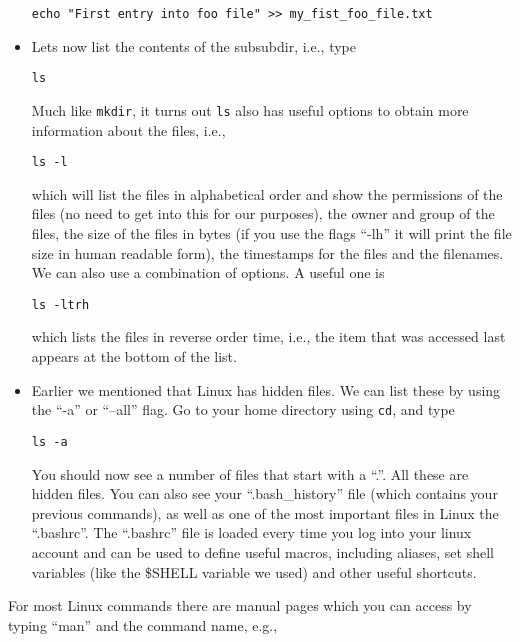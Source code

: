 \documentclass[aps,showpacs,prd,notitlepage,preprintnumbers,amsmath,amssymb,letterpaper]{revtex4}
\begin{document}
\begin{itemize}
\begin{verbatim}
echo "First entry into foo file" >> my_fist_foo_file.txt
\end{verbatim}

\item Lets now list the contents of the subsubdir, i.e., type

\begin{verbatim}
ls 
\end{verbatim}

Much like \verb|mkdir|, it turns out \verb|ls| also has useful options to obtain more information about the files, i.e.,

\begin{verbatim}
ls -l
\end{verbatim}

which will list the files in alphabetical order and show the permissions of the files (no need to get into this for our purposes), the owner and group of the files, the size of the files in bytes (if you use the flags ``-lh'' it will print the file size in human readable form), the timestamps for the files and the filenames. We can also use a combination of options. A useful one is

\begin{verbatim}
ls -ltrh
\end{verbatim}

which lists the files in reverse order time, i.e., the item that was
accessed last appears at the bottom of the list.

\item Earlier we mentioned that Linux has hidden files. We can list
  these by using the ``-a'' or ``--all'' flag. Go to your home
  directory using \verb|cd|, and type

\begin{verbatim}
ls -a
\end{verbatim}

You should now see a number of files that start with a ``.''. All
these are hidden files. You can also see your ``.bash\_history'' file
(which contains your previous commands), as well as one of the most
important files in Linux the ``.bashrc''. The ``.bashrc'' file is
loaded every time you log into your linux account and can be used to
define useful macros, including aliases, set shell variables (like the
\$SHELL variable we used) and other useful shortcuts.


\end{itemize}

For most Linux commands there are manual pages which you can access by typing ``man'' and the command name, e.g.,
\end{document}
